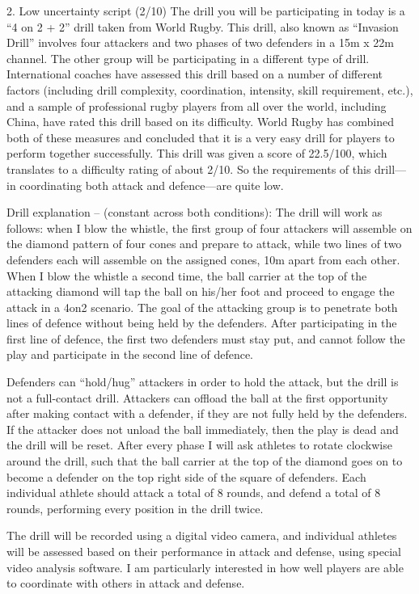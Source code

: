 2. Low uncertainty script (2/10)
The drill you will be participating in today is a ``4 on 2 + 2'' drill taken from World Rugby.  This drill, also known as ``Invasion Drill'' involves four attackers and two phases of two defenders in a 15m x 22m channel.  The other group will be participating in a different type of drill.  International coaches have assessed this drill based on a number of different factors (including drill complexity, coordination, intensity, skill requirement, etc.), and a sample of professional rugby players from all over the world, including China, have rated this drill based on its difficulty.  World Rugby has combined both of these measures and concluded that it is a very easy drill for players to perform together successfully.  This drill was given a score of 22.5/100, which translates to a difficulty rating of about 2/10.  So the requirements of this drill—in coordinating both attack and defence—are quite low.

Drill explanation – (constant across both conditions):
The drill will work as follows:  when I blow the whistle, the first group of four attackers will assemble on the diamond pattern of four cones and prepare to attack, while two lines of two defenders each will assemble on the assigned cones, 10m apart from each other.  When I blow the whistle a second time, the ball carrier at the top of the attacking diamond will tap the ball on his/her foot and proceed to engage the attack in a 4on2 scenario.  The goal of the attacking group is to penetrate both lines of defence without being held by the defenders.  After participating in the first line of defence, the first two defenders must stay put, and cannot follow the play and participate in the second line of defence.

Defenders can “hold/hug” attackers in order to hold the attack, but the drill is not a full-contact drill.  Attackers can offload the ball at the first opportunity after making contact with a defender, if they are not fully held by the defenders.  If the attacker does not unload the ball immediately, then the play is dead and the drill will be reset.
After every phase I will ask athletes to rotate clockwise around the drill, such that the ball carrier at the top of the diamond goes on to become a defender on the top right side of the square of defenders. Each individual athlete should attack a total of 8 rounds, and defend a total of 8 rounds, performing every position in the drill twice.

The drill will be recorded using a digital video camera, and individual athletes will be assessed based on their performance in attack and defense, using special video analysis software. I am particularly interested in how well players are able to coordinate with others in attack and defense.



